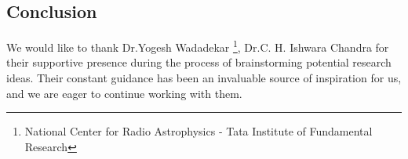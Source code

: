 \documentclass{article}
\begin{document}
\begin{multicols*}{2}
\section{Conclusion}
We would like to thank Dr.Yogesh Wadadekar \footnote{\label{NCRA-TIFR} National Center for Radio Astrophysics - Tata Institute of Fundamental Research}, Dr.C. H. Ishwara Chandra \footnotemark[\ref{NCRA-TIFR}] for their supportive presence during the process of brainstorming potential research ideas. Their constant guidance has been an invaluable source of inspiration for us, and we are eager to continue working with them.

\end{multicols*}
\end{document}

